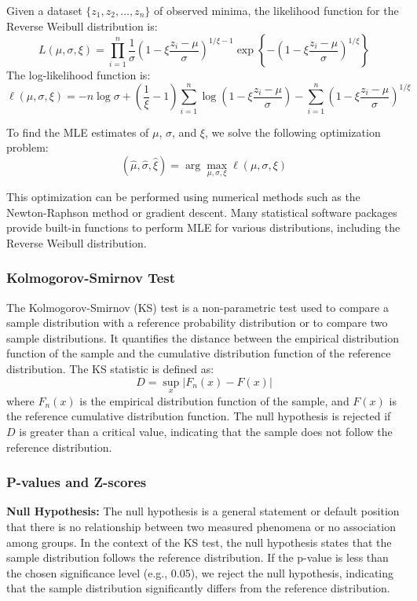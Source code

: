 \documentclass{article}
\begin{document}
Given a dataset \( \{z_1, z_2, \ldots, z_n\} \) of observed minima, the likelihood function for the Reverse Weibull distribution is:
\[
L(\mu, \sigma, \xi) = \prod_{i=1}^n \frac{1}{\sigma} \left( 1 - \xi \frac{z_i - \mu}{\sigma} \right)^{1/\xi - 1} \exp \left\{ - \left( 1 - \xi \frac{z_i - \mu}{\sigma} \right)^{1/\xi} \right\}
\]
The log-likelihood function is:
\[
\ell(\mu, \sigma, \xi) = -n \log \sigma + \left( \frac{1}{\xi} - 1 \right) \sum_{i=1}^n \log \left( 1 - \xi \frac{z_i - \mu}{\sigma} \right) - \sum_{i=1}^n \left( 1 - \xi \frac{z_i - \mu}{\sigma} \right)^{1/\xi}
\]

To find the MLE estimates of \( \mu \), \( \sigma \), and \( \xi \), we solve the following optimization problem:
\[
(\hat{\mu}, \hat{\sigma}, \hat{\xi}) = \arg \max_{\mu, \sigma, \xi} \ell(\mu, \sigma, \xi)
\]

This optimization can be performed using numerical methods such as the Newton-Raphson method or gradient descent. Many statistical software packages provide built-in functions to perform MLE for various distributions, including the Reverse Weibull distribution.

\subsubsection{Kolmogorov-Smirnov Test}
The Kolmogorov-Smirnov (KS) test is a non-parametric test used to compare a sample distribution with a reference probability distribution or to compare two sample distributions. It quantifies the distance between the empirical distribution function of the sample and the cumulative distribution function of the reference distribution. The KS statistic is defined as:
\[
D = \sup_x |F_n(x) - F(x)|
\]
where \( F_n(x) \) is the empirical distribution function of the sample, and \( F(x) \) is the reference cumulative distribution function. The null hypothesis is rejected if \( D \) is greater than a critical value, indicating that the sample does not follow the reference distribution.

\subsubsection{P-values and Z-scores}
\textbf{Null Hypothesis:} The null hypothesis is a general statement or default position that there is no relationship between two measured phenomena or no association among groups. In the context of the KS test, the null hypothesis states that the sample distribution follows the reference distribution. If the p-value is less than the chosen significance level (e.g., 0.05), we reject the null hypothesis, indicating that the sample distribution significantly differs from the reference distribution.
\end{document}
